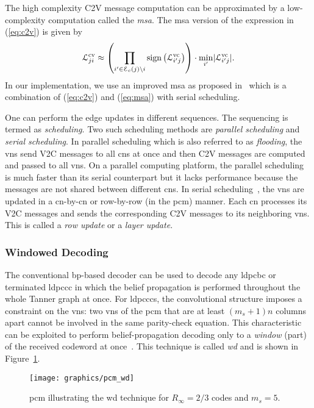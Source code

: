 The high complexity C2V message computation can be approximated by a low-complexity computation called the \emph{\acf{msa}}. The \ac{msa} version of the expression in (\ref{eq:c2v}) is given by
\begin{align}\label{eq:msa}
\mathcal{L}^{\mathrm{cv}}_{ji}\approx\left(\prod_{i^\prime\in\mathcal{E}_c(j)\backslash i}\operatorname{sign}\left(\mathcal{L}^{\mathrm{vc}}_{i^\prime j}\right)\right)\cdot\min_{i^\prime}\lvert\mathcal{L}^{\mathrm{vc}}_{i^\prime j}\rvert.
\end{align}
In our implementation, we use an improved \ac{msa} as proposed in~\cite{Jones2003} which is a combination of (\ref{eq:c2v}) and (\ref{eq:msa}) with serial scheduling.

One can perform the edge updates in different sequences. The sequencing is termed as \emph{scheduling}. Two such scheduling methods are \emph{parallel scheduling} and \emph{serial scheduling}. In parallel scheduling which is also referred to as \emph{flooding}, the \acp{vn} send V2C messages to all \acp{cn} at once and then C2V messages are computed and passed to all \acp{vn}. On a parallel computing platform, the parallel scheduling is much faster than its serial counterpart but it lacks performance because the messages are not shared between different \acp{cn}. In serial scheduling~\cite{Zhang2002}, the \acp{vn} are updated in a \ac{cn}-by-\ac{cn} or row-by-row (in the \ac{pcm}) manner. Each \ac{cn} processes its V2C messages and sends the corresponding C2V messages to its neighboring \acp{vn}. This is called a \emph{row update} or a \emph{layer update}.

\subsubsection{Windowed Decoding}\label{sec:back_wd}
The conventional \ac{bp}-based decoder can be used to decode any \ac{ldpcbc} or terminated \ac{ldpccc} in which the belief propagation is performed throughout the whole Tanner graph at once. For \acp{ldpccc}, the convolutional structure imposes a constraint on the \acp{vn}: two \acp{vn} of the \ac{pcm} that are at least $(m_s+1)n$ columns apart cannot be involved in the same parity-check equation. This characteristic can be exploited to perform belief-propagation decoding only to a \emph{window} (part) of the received codeword at once~\cite{Iyengar2012}. This technique is called \emph{\ac{wd}} and is shown in Figure~\ref{fig:wd}.
\begin{figure}[htbp]
  \centering
  \texttt{[image: graphics/pcm\_wd]}
  \caption{\ac{pcm} illustrating the \acl{wd} technique for $R_\infty=2/3$ codes and $m_s=5$.}
  \label{fig:wd}
\end{figure}

